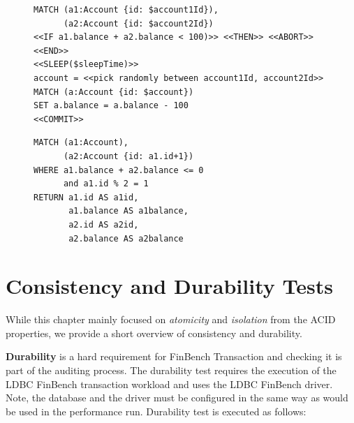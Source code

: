 \begin{figure}[htb]
\centering
\begin{minipage}{0.55\linewidth}
\begin{lstlisting}[language=cypher,label=fig:ws1,caption=\tx{WS $T_\mathrm{W}$}.]
MATCH (a1:Account {id: $account1Id}), 
      (a2:Account {id: $account2Id})
<<IF a1.balance + a2.balance < 100)>> <<THEN>> <<ABORT>> <<END>>
<<SLEEP($sleepTime)>>
account = <<pick randomly between account1Id, account2Id>>
MATCH (a:Account {id: $account})
SET a.balance = a.balance - 100
<<COMMIT>>
\end{lstlisting}
\end{minipage}
\quad
\begin{minipage}{0.33\linewidth}
\begin{lstlisting}[language=cypher,label=fig:ws2,caption=\tx{WS $T_\mathrm{R}$}.]
MATCH (a1:Account), 
      (a2:Account {id: a1.id+1})
WHERE a1.balance + a2.balance <= 0 
      and a1.id % 2 = 1
RETURN a1.id AS a1id, 
       a1.balance AS a1balance, 
       a2.id AS a2id, 
       a2.balance AS a2balance
\end{lstlisting}
\end{minipage}
\end{figure}

\newpage

\section{Consistency and Durability Tests}
\label{sec:cd}

While this chapter mainly focused on \emph{atomicity} and \emph{isolation} from 
the ACID properties, we provide a short overview of consistency and durability.

{\bf Durability} is a hard requirement for FinBench Transaction and checking it 
is part of the auditing process. The durability test requires the execution of 
the LDBC FinBench transaction workload and uses the LDBC FinBench driver. Note, 
the database and the driver must be configured in the same way as would be used 
in the performance run. Durability test is executed as follows:

